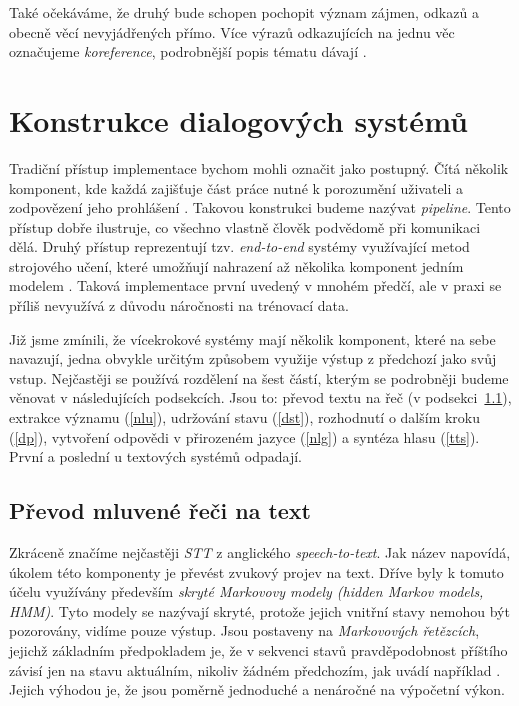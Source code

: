Také očekáváme, že druhý bude schopen pochopit význam zájmen, odkazů
a obecně věcí nevyjádřených přímo. Více výrazů odkazujících na jednu věc
označujeme \textit{koreference}, podrobnější popis tématu dávají
\citet[kapitola 21]{jurafsky_slp_2020}.


\section{Konstrukce dialogových systémů}

Tradiční přístup implementace bychom mohli označit jako postupný. Čítá několik
komponent, kde každá zajišťuje část práce nutné k porozumění uživateli a
zodpovězení jeho prohlášení \citep[sekce 4.1]{gao_neural_2019}. Takovou konstrukci budeme nazývat \textit{pipeline}.
Tento přístup dobře ilustruje, co všechno vlastně
člověk podvědomě při komunikaci dělá. Druhý přístup reprezentují tzv. \textit{end-to-end}
systémy využívající metod strojového učení, které umožňují nahrazení až
několika komponent jedním modelem \citep[sekce 4.6]{gao_neural_2019}. Taková implementace první uvedený v mnohém
předčí, ale v praxi se příliš nevyužívá z důvodu náročnosti na trénovací data.

Již jsme zmínili, že vícekrokové systémy mají několik komponent, které na sebe
navazují, jedna obvykle určitým způsobem využije výstup z předchozí jako svůj
vstup. Nejčastěji se používá rozdělení na šest částí, kterým se podrobněji
budeme věnovat v následujících podsekcích. Jsou to: převod textu na řeč (v podsekci~\ref{stt}),
extrakce významu (\ref{nlu}), udržování stavu (\ref{dst}), rozhodnutí o dalším kroku (\ref{dp}),
vytvoření odpovědi v přirozeném jazyce (\ref{nlg}) a syntéza hlasu (\ref{tts}). První
a poslední u textových systémů odpadají.

\subsection{Převod mluvené řeči na text}\label{stt}

Zkráceně značíme nejčastěji \textit{STT} z anglického \textit{speech-to-text}.
Jak název napovídá, úkolem této komponenty je převést zvukový projev na text.
Dříve byly k tomuto účelu využívány především \textit{skryté
    Markovovy modely (hidden Markov models, HMM)}. Tyto modely se nazývají skryté,
protože jejich vnitřní stavy nemohou být pozorovány, vidíme pouze výstup.
Jsou postaveny na \textit{Markovových řetězcích}, jejichž základním předpokladem
je, že v sekvenci stavů pravděpodobnost příštího závisí jen na stavu aktuálním,
nikoliv žádném předchozím, jak uvádí například \citet[strana 4]{brooks_handbook_2011}.
Jejich výhodou je, že jsou poměrně jednoduché a nenáročné na výpočetní výkon.

